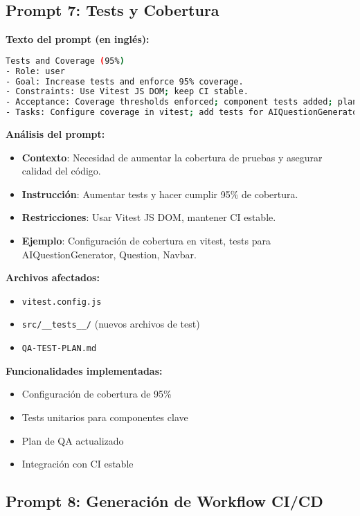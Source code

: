 \documentclass[12pt,a4paper]{article}
\begin{document}
\subsection{Prompt 7: Tests y Cobertura}

\textbf{Texto del prompt (en inglés):}
\begin{lstlisting}[language=bash]
Tests and Coverage (95%)
- Role: user
- Goal: Increase tests and enforce 95% coverage.
- Constraints: Use Vitest JS DOM; keep CI stable.
- Acceptance: Coverage thresholds enforced; component tests added; plan updated.
- Tasks: Configure coverage in vitest; add tests for AIQuestionGenerator, Question, Navbar; update QA plan.
\end{lstlisting}

\textbf{Análisis del prompt:}
\begin{itemize}
    \item \textbf{Contexto}: Necesidad de aumentar la cobertura de pruebas y asegurar calidad del código.
    \item \textbf{Instrucción}: Aumentar tests y hacer cumplir 95\% de cobertura.
    \item \textbf{Restricciones}: Usar Vitest JS DOM, mantener CI estable.
    \item \textbf{Ejemplo}: Configuración de cobertura en vitest, tests para AIQuestionGenerator, Question, Navbar.
\end{itemize}

\textbf{Archivos afectados:}
\begin{itemize}
    \item \texttt{vitest.config.js}
    \item \texttt{src/__tests__/} (nuevos archivos de test)
    \item \texttt{QA-TEST-PLAN.md}
\end{itemize}

\textbf{Funcionalidades implementadas:}
\begin{itemize}
    \item Configuración de cobertura de 95\%
    \item Tests unitarios para componentes clave
    \item Plan de QA actualizado
    \item Integración con CI estable
\end{itemize}

\subsection{Prompt 8: Generación de Workflow CI/CD}
\end{document}
